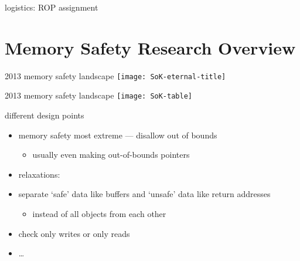 \begin{frame}
    \titlepage
\end{frame}


\begin{frame}{logistics: ROP assignment}
\end{frame}

\section{Memory Safety Research Overview}

\begin{frame}{2013 memory safety landscape}
    \texttt{[image: SoK-eternal-title]}
\end{frame}

\begin{frame}{2013 memory safety landscape}
    \texttt{[image: SoK-table]}
\end{frame}

\begin{frame}{different design points}
    \begin{itemize}
    \item memory safety most extreme --- disallow out of bounds
        \begin{itemize}
        \item usually even making out-of-bounds pointers
        \end{itemize}
    \item relaxations:
        \vspace{.5cm}
    \item separate `safe' data like buffers and `unsafe' data like return addresses
        \begin{itemize}
        \item instead of all objects from each other
        \end{itemize}
    \item check only writes or only reads
    \item \ldots
    \end{itemize}
\end{frame}


